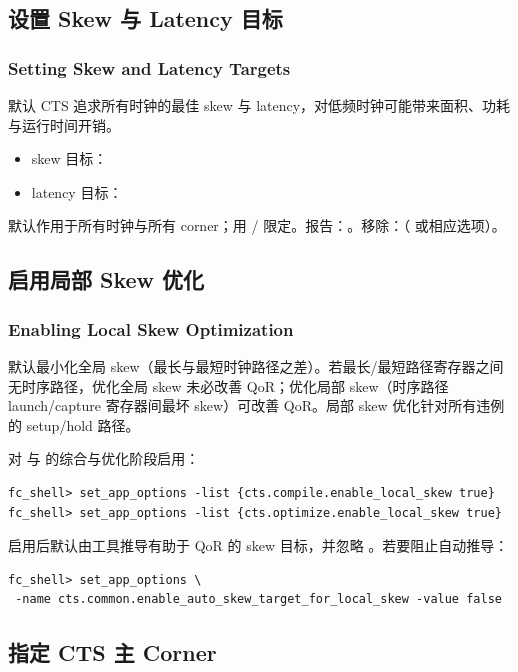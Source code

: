 \subsection{设置 Skew 与 Latency 目标}
\subsubsection*{Setting Skew and Latency Targets}

默认 CTS 追求所有时钟的最佳 skew 与 latency，对低频时钟可能带来面积、功耗与运行时间开销。
\begin{itemize}
  \item skew 目标：
  \item latency 目标：
\end{itemize}
默认作用于所有时钟与所有 corner；用 / 限定。报告：。移除：（ 或相应选项）。

\subsection{启用局部 Skew 优化}
\subsubsection*{Enabling Local Skew Optimization}

默认最小化全局 skew（最长与最短时钟路径之差）。若最长/最短路径寄存器之间无时序路径，优化全局 skew 未必改善 QoR；优化局部 skew（时序路径 launch/capture 寄存器间最坏 skew）可改善 QoR。局部 skew 优化针对所有违例的 setup/hold 路径。

对  与  的综合与优化阶段启用：
\begin{lstlisting}
fc_shell> set_app_options -list {cts.compile.enable_local_skew true}
fc_shell> set_app_options -list {cts.optimize.enable_local_skew true}
\end{lstlisting}
启用后默认由工具推导有助于 QoR 的 skew 目标，并忽略 。若要阻止自动推导：
\begin{lstlisting}
fc_shell> set_app_options \
 -name cts.common.enable_auto_skew_target_for_local_skew -value false
\end{lstlisting}

\subsection{指定 CTS 主 Corner}
